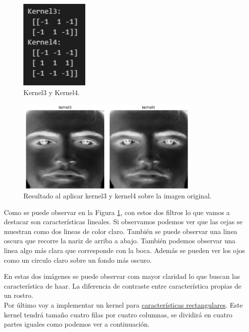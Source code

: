 \documentclass[a4paper]{article}
\begin{document}
\begin{figure}[h!]
    \centering
    \includegraphics[width=0.30\textwidth]{../img/k3k4.png}
    \caption{Kernel3 y Kernel4.}
\end{figure}

\begin{figure}[h!]
    \centering
    \includegraphics[width=0.80\textwidth]{../img/resultadok3k4.png}
    \caption{Resultado al aplicar kernel3 y kernel4 sobre la imagen original.}
    \label{fig:k3k4}
\end{figure}

Como se puede observar en la Figura \ref{fig:k3k4}, con estos dos filtros lo que vamos a destacar son características lineales.
Si observamos podemos ver que las cejas se muestran como dos lineas de color claro.
También se puede observar una linea oscura que recorre la nariz de arriba a abajo.
También podemos observar una linea algo más clara que corresponde con la boca.
Además se pueden ver los ojos como un circulo claro sobre un fondo más oscuro.

En estas dos imágenes se puede observar com mayor claridad lo que buscan las característica de haar.
La diferencia de contraste entre característica propias de un rostro.\\

Por último voy a implementar un kernel para \underline{características rectangulares}.
Este kernel tendrá tamaño cuatro filas por cuatro columnas, se dividirá en cuatro partes iguales como podemos ver a continuación.
\end{document}
